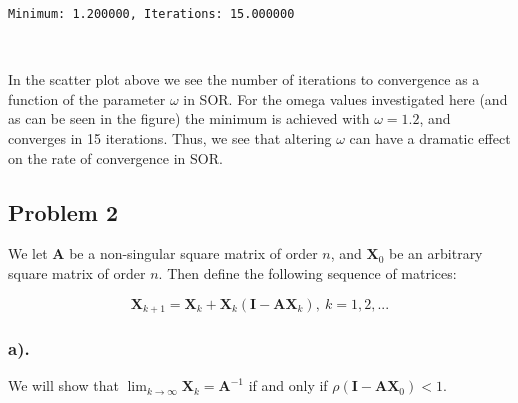 \documentclass[11pt]{article}
\begin{document}
    \begin{Verbatim}[commandchars=\\\{\}]
Minimum: 1.200000, Iterations: 15.000000
    \end{Verbatim}

    \begin{center}
    \end{center}
    { \hspace*{\fill} \\}
    
    In the scatter plot above we see the number of iterations to convergence
as a function of the parameter \(\omega\) in SOR. For the omega values
investigated here (and as can be seen in the figure) the minimum is
achieved with \(\omega=1.2\), and converges in 15 iterations. Thus, we
see that altering \(\omega\) can have a dramatic effect on the rate of
convergence in SOR.

    \hypertarget{problem-2}{%
\subsection*{Problem 2}\label{problem-2}}

    We let \(\mathbf{A}\) be a non-singular square matrix of order \(n\),
and \(\mathbf{X}_0\) be an arbitrary square matrix of order \(n\). Then
define the following sequence of matrices:

\[ \mathbf{X}_{k+1} = \mathbf{X}_k + \mathbf{X}_k(\mathbf{I}-\mathbf{AX}_k),\:k=1,2,... \]

    \hypertarget{a.}{%
\subsubsection*{a).}\label{a.}}

We will show that \(\lim_{k\to\infty}\mathbf{X}_k=\mathbf{A}^{-1}\) if
and only if \(\rho(\mathbf{I}-\mathbf{AX}_0)<1\).
\end{document}
